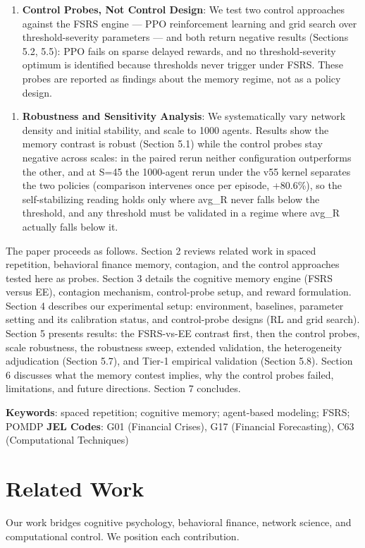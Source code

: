 \documentclass[11pt]{article}
\begin{document}
\begin{enumerate}
\item \textbf{Control Probes, Not Control Design}: We test two control approaches against the FSRS engine --- PPO reinforcement learning and grid search over threshold-severity parameters --- and both return negative results (Sections 5.2, 5.5): PPO fails on sparse delayed rewards, and no threshold-severity optimum is identified because thresholds never trigger under FSRS. These probes are reported as findings about the memory regime, not as a policy design.
\end{enumerate}

\begin{enumerate}
\item \textbf{Robustness and Sensitivity Analysis}: We systematically vary network density and initial stability, and scale to 1000 agents. Results show the memory contrast is robust (Section 5.1) while the control probes stay negative across scales: in the paired rerun neither configuration outperforms the other, and at S=45 the 1000-agent rerun under the v55 kernel separates the two policies (comparison intervenes once per episode, +80.6\%), so the self-stabilizing reading holds only where avg\_R never falls below the threshold, and any threshold must be validated in a regime where avg\_R actually falls below it.
\end{enumerate}

The paper proceeds as follows. Section 2 reviews related work in spaced repetition, behavioral finance memory, contagion, and the control approaches tested here as probes. Section 3 details the cognitive memory engine (FSRS versus EE), contagion mechanism, control-probe setup, and reward formulation. Section 4 describes our experimental setup: environment, baselines, parameter setting and its calibration status, and control-probe designs (RL and grid search). Section 5 presents results: the FSRS-vs-EE contrast first, then the control probes, scale robustness, the robustness sweep, extended validation, the heterogeneity adjudication (Section 5.7), and Tier-1 empirical validation (Section 5.8). Section 6 discusses what the memory contest implies, why the control probes failed, limitations, and future directions. Section 7 concludes.

\textbf{Keywords}: spaced repetition; cognitive memory; agent-based modeling; FSRS; POMDP \textbf{JEL Codes}: G01 (Financial Crises), G17 (Financial Forecasting), C63 (Computational Techniques)

\section{Related Work}
Our work bridges cognitive psychology, behavioral finance, network science, and computational control. We position each contribution.
\end{document}
